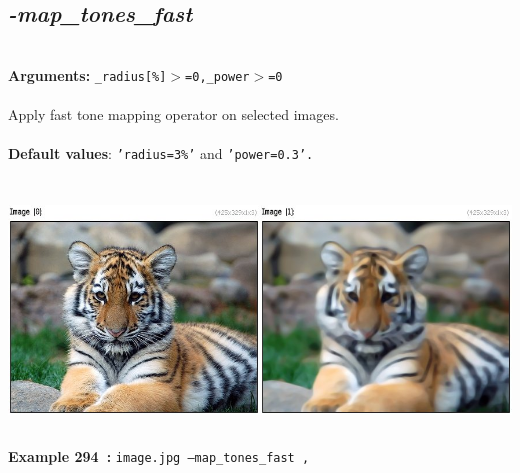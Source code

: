 \documentclass[a4paper,11pt,twoside]{book}
\begin{document}
\subsection{\emph{-map\_tones\_fast} }\vspace*{-0.5em}
~\\\textbf{Arguments: } 
{\small \texttt{\_radius[\%]$>$=0,\_power$>$=0}}\\~\\
Apply fast tone mapping operator on selected images.
~\\~\\\textbf{Default values}: {\small \texttt{'radius=3\%'} and \texttt{'power=0.3'.}}
\begin{center}\includegraphics[keepaspectratio=true,height=7cm,width=\textwidth]{img/gmic_def294.jpg}\\
{\footnotesize \textbf{Example 294~:} \texttt{image.jpg --map\_tones\_fast ,}}
\end{center}
\end{document}
